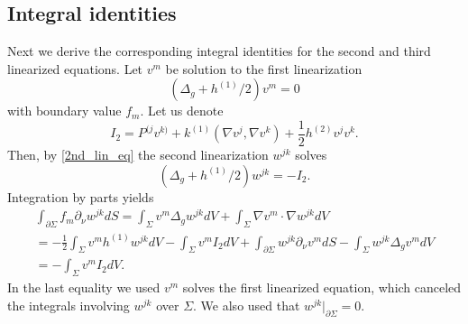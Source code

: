 \documentclass[12pt]{amsart}
\def\p{\partial}
\theoremstyle{definition}
\theoremstyle{remark}
\begin{document}
\subsection{Integral identities} \label{ss2.5}
Next we derive the corresponding integral identities for the second and third linearized equations.
		Let $v^m$ be solution to the first linearization
\[
 (\Delta_g+h^{(1)}/2)v^m=0
\]
with boundary value $f_m$.  Let us denote
 \[
  I_2=P^{(j}v^{k)}+k^{(1)}(\nabla v^{j},\nabla v^{k})+\frac{1}{2}h^{(2)}v^{j}v^{k}.
 \]
 Then, by \eqref{2nd_lin_eq} the second linearization $w^{jk}$ solves
 \[
  (\Delta_g+h^{(1)}/2)w^{jk}=-I_2.
 \]
Integration by parts yields
\begin{multline}\label{eq:2nd_lin_calc}
 \int_{\p \Sigma}f_m\p_\nu w^{jk}dS=\int_{\Sigma} v^m\Delta_{g} w^{jk}dV + \int_{\Sigma} \nabla v^m\cdot \nabla w^{jk}dV \\
 =-\frac{1}{2}\int_{\Sigma} v^mh^{(1)} w^{jk}dV-\int_\Sigma v^mI_2dV 
 + \int_{\p \Sigma}w^{jk}\p_\nu v^mdS- \int_{\Sigma}w^{jk} \Delta_{g} v^mdV \\
 =-\int_\Sigma v^m I_2dV. %
\end{multline}
In the last equality we used $v^m$ solves the first linearized equation, which canceled the integrals involving $w^{jk}$ over $\Sigma$. We also used that $w^{jk}|_{\p \Sigma}=0$.
\end{document}
